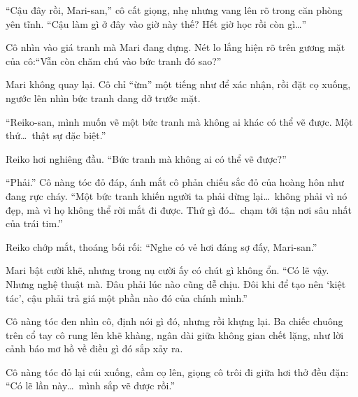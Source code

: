 \documentclass[../main.tex]{subfiles}
\begin{document}
``Cậu đây rồi, Mari-san,'' cô cất giọng, nhẹ nhưng vang lên rõ trong căn phòng yên tĩnh. ``Cậu làm gì ở đây vào giờ này thế? Hết giờ học rồi còn gì\dots''

Cô nhìn vào giá tranh mà Mari đang dựng. Nét lo lắng hiện rõ trên gương mặt của cô:``Vẫn còn chăm chú vào bức tranh đó sao?''

Mari không quay lại. Cô chỉ ``ừm'' một tiếng như để xác nhận, rồi đặt cọ xuống, ngước lên nhìn bức tranh dang dở trước mặt.

``Reiko-san, mình muốn vẽ một bức tranh mà không ai khác có thể vẽ được. Một thứ\dots\ thật sự đặc biệt.''

Reiko hơi nghiêng đầu. ``Bức tranh mà không ai có thể vẽ được?''

``Phải.'' Cô nàng tóc đỏ đáp, ánh mắt cô phản chiếu sắc đỏ của hoàng hôn như đang rực cháy. ``Một bức tranh khiến người ta phải dừng lại\dots\ không phải vì nó đẹp, mà vì họ không thể rời mắt đi được. Thứ gì đó\dots\ chạm tới tận nơi sâu nhất của trái tim.''

Reiko chớp mắt, thoáng bối rối: ``Nghe có vẻ hơi đáng sợ đấy, Mari-san.''

Mari bật cười khẽ, nhưng trong nụ cười ấy có chút gì không ổn. ``Có lẽ vậy. Nhưng nghệ thuật mà. Đâu phải lúc nào cũng dễ chịu. Đôi khi để tạo nên `kiệt tác', cậu phải trả giá một phần nào đó của chính mình.''

Cô nàng tóc đen nhìn cô, định nói gì đó, nhưng rồi khựng lại. Ba chiếc chuông trên cổ tay cô rung lên khẽ khàng, ngân dài giữa không gian chết lặng, như lời cảnh báo mơ hồ về điều gì đó sắp xảy ra.

Cô nàng tóc đỏ lại cúi xuống, cầm cọ lên, giọng cô trôi đi giữa hơi thở đều đặn: ``Có lẽ lần này\dots\ mình sắp vẽ được rồi.''
\end{document}
